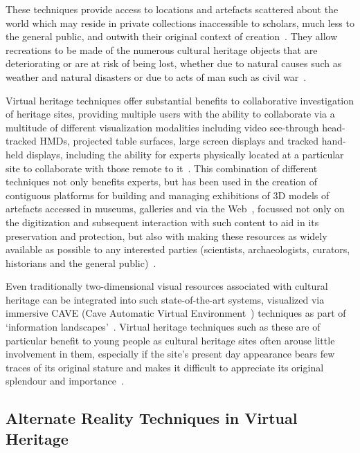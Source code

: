 These techniques provide access to locations and artefacts scattered about the world which may reside in private collections inaccessible to scholars, much less to the general public, and outwith their original context of creation~\cite{griffin:recovering}. They allow recreations to be made of the numerous cultural heritage objects that are deteriorating or are at risk of being lost, whether due to natural causes such as weather and natural disasters or due to acts of man such as civil war~\cite{Ikeuchi2003}.

Virtual heritage techniques offer substantial benefits to collaborative investigation of heritage sites, providing multiple users with the ability to collaborate via a multitude of different visualization modalities including video see-through head-tracked HMDs, projected table surfaces, large screen displays and tracked hand-held displays, including the ability for experts physically located at a particular site to collaborate with those remote to it~\cite{benko:collaborative}. This combination of different techniques not only benefits experts, but has been used in the creation of contiguous platforms for building and managing exhibitions of 3D models of artefacts accessed in museums, galleries and via the Web~\cite{Wojciechowski2004}, focussed not only on the digitization and subsequent interaction with such content to aid in its preservation and protection, but also with making these resources as widely available as possible to any interested parties (scientists, archaeologists, curators, historians and the general public)~\cite{walczak:applications}.

Even traditionally two-dimensional visual resources associated with cultural heritage can be integrated into such state-of-the-art systems, visualized via immersive CAVE (Cave Automatic Virtual Environment~\cite{Tzortzaki2002}) techniques as part of `information landscapes'~\cite{Ruffaldi2008}. Virtual heritage techniques such as these are of particular benefit to young people as cultural heritage sites often arouse little involvement in them, especially if the site's present day appearance bears few traces of its original stature and makes it difficult to appreciate its original splendour and importance~\cite{ardito:combining}.


\subsection{Alternate Reality Techniques in Virtual Heritage}

